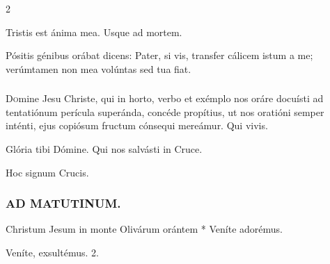 \documentclass[9pt,twoside]{extarticle}
\begin{document}
\begin{multicols}{2}
\begin{tightlist}{}
\item {} Tristis est ánima mea.  Usque ad mortem.
\item {} Pósitis génibus orábat dicens: Pater, si vis, transfer cálicem istum a me; verúmtamen non mea volúntas sed tua fiat.
\end{tightlist}

\subsubsection*{\center {}}
\lettrine{D}omine Jesu Christe, qui in horto, verbo et exémplo nos oráre docuísti ad tentatiónum perícula superánda, concéde propítius, ut nos oratióni semper inténti, ejus copiósum fructum cónsequi mereámur. Qui vivis.

\begin{tightlist}{}
\item {} Glória tibi Dómine. Qui nos salvásti in Cruce.
\item {} Hoc signum Crucis.
\end{tightlist}

\subsubsection*{\center \textsc{AD MATUTINUM.}}
\begin{tightlist}{}
\item {} Christum Jesum in monte Olivárum orántem * Veníte adorémus.
\item {} Veníte, exsultémus. 2.
\item {}
\end{tightlist}


\end{multicols}
\end{document}
